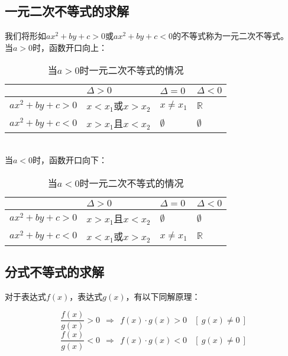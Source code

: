 \documentclass[UTF8]{ctexart}
\begin{document}
\newpage

\subsection{一元二次不等式的求解}
    我们将形如$ax^2+by+c>0$或$ax^2+by+c<0$的不等式称为一元二次不等式。\\[5mm]
    当$a>0$时，函数开口向上：\vspace{5pt}
    \begin{table}[h]
        \begin{center}
            \begin{tabular}{l|l|l|l}
                \hline
                &$\Delta>0$\qquad\qquad\qquad\qquad&$\Delta=0$\qquad\qquad\qquad\qquad&$\Delta<0$\qquad\qquad\qquad\qquad \\ \hline
                $ax^2+by+c>0$\qquad&$x<x_1$或$x>x_2$&$x\neq x_1$&$\mathbb{R}$\\ \hline
                $ax^2+by+c<0$\qquad&$x>x_1$且$x<x_2$&$\emptyset$&$\emptyset$\\ \hline
            \end{tabular}
            \caption{当$a>0$时一元二次不等式的情况}
        \end{center}
    \end{table}\\
    当$a<0$时，函数开口向下：\vspace{5pt}
    \begin{table}[h]
        \begin{center}
            \begin{tabular}{l|l|l|l}
                \hline
                &$\Delta>0$\qquad\qquad\qquad\qquad&$\Delta=0$\qquad\qquad\qquad\qquad&$\Delta<0$\qquad\qquad\qquad\qquad \\ \hline
                $ax^2+by+c>0$\qquad&$x>x_1$且$x<x_2$&$\emptyset$&$\emptyset$\\ \hline
                $ax^2+by+c<0$\qquad&$x<x_1$或$x>x_2$&$x\neq x_1$&$\mathbb{R}$\\ \hline
            \end{tabular}
            \caption{当$a<0$时一元二次不等式的情况}
        \end{center}
    \end{table}

\subsection{分式不等式的求解}
    对于表达式$f(x)$，表达式$g(x)$，有以下同解原理：\\[1mm]
    \begin{large}
        \begin{equation*}
            \frac{f(x)}{g(x)}>0~~\Rightarrow~~f(x)\cdot g(x)>0~~~~\left[~g(x)\neq 0~\right]
        \end{equation*}\vspace{5pt}
        \begin{equation*}
            \frac{f(x)}{g(x)}<0~~\Rightarrow~~f(x)\cdot g(x)<0~~~~\left[~g(x)\neq 0~\right]
        \end{equation*}
    \end{large}\vspace{10pt}
\end{document}
